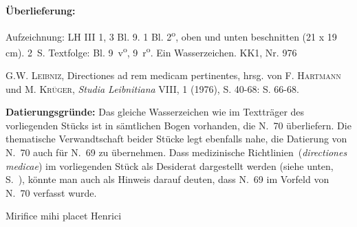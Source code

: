 \begin{ledgroupsized}[r]{120mm}%
\footnotesize%
\pstart%
\noindent\textbf{\"{U}berlieferung:}%
\pend%
\end{ledgroupsized}%
\begin{ledgroupsized}[r]{114mm}%
\footnotesize%
\pstart%
\parindent -6mm%
%
Aufzeichnung:
LH III 1, 3 Bl. 9.
1 Bl. 2\textsuperscript{o}, oben und unten beschnitten (21 x 19 cm).
2~S. Textfolge: Bl. 9~v\textsuperscript{o}, 9~r\textsuperscript{o}.
Ein Wasserzeichen.%
\newline%
KK1, Nr. 976%
\pend%
\end{ledgroupsized}%
%
\begin{ledgroupsized}[r]{114mm}%
\footnotesize%
\pstart%
\parindent -6mm%
%
\cite{01131}\textsc{G.W. Leibniz}, \glqq Directiones ad rem medicam pertinentes\grqq, hrsg. von \textsc{F. Hartmann} und \textsc{M. Kr\"{u}ger}, \textit{Studia Leibnitiana} VIII, 1 (1976), S. 40-68: S. 66-68.
\pend%
\end{ledgroupsized}%
%
%
\vspace*{5mm}%
\begin{ledgroup}%
\footnotesize%
\pstart%
\noindent%
\footnotesize{%
\textbf{Datierungsgr\"{u}nde:}
Das gleiche Wasserzeichen wie im Textträger des vorliegenden Stücks ist in sämtlichen Bogen vorhanden,
die N.~70
überliefern. Die thematische Verwandtschaft beider Stücke legt ebenfalls nahe,
die Datierung von N.~70
auch für N.~69
zu übernehmen.
Dass \glqq medizinische Richtlinien\grqq~(\textit{directiones medicae}) im vorliegenden Stück
als Desiderat dargestellt werden (siehe unten, S.~),
könnte man auch als Hinweis darauf deuten, dass N.~69
im Vorfeld von N.~70
verfasst wurde.%
}%
\pend%
\end{ledgroup}%
%
%
\vspace*{8mm}%
\count{}
\count{}
\count{}
\pstart%
\normalsize%
\noindent%
[9~v\textsuperscript{o}]
Mirifice mihi placet Henrici\protect{}
